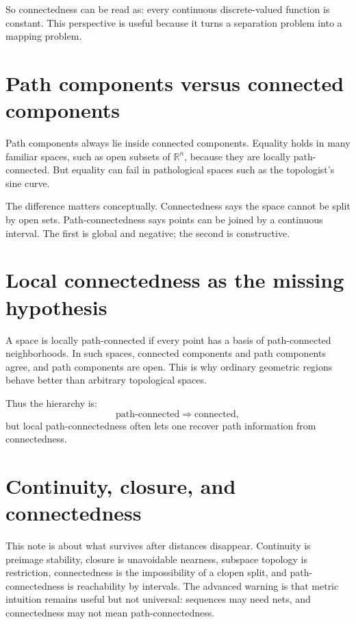 So connectedness can be read as: every continuous discrete-valued function is constant.  This perspective is useful because it turns a separation problem into a mapping problem.

\section{Path components versus connected components}

Path components always lie inside connected components.  Equality holds in many familiar spaces, such as open subsets of \(\mathbb R^n\), because they are locally path-connected.  But equality can fail in pathological spaces such as the topologist's sine curve.

The difference matters conceptually.  Connectedness says the space cannot be split by open sets.  Path-connectedness says points can be joined by a continuous interval.  The first is global and negative; the second is constructive.

\section{Local connectedness as the missing hypothesis}

A space is locally path-connected if every point has a basis of path-connected neighborhoods.  In such spaces, connected components and path components agree, and path components are open.  This is why ordinary geometric regions behave better than arbitrary topological spaces.

Thus the hierarchy is:
\[
  \text{path-connected}\Rightarrow\text{connected},
\]
but local path-connectedness often lets one recover path information from connectedness.

\section{Continuity, closure, and connectedness}

This note is about what survives after distances disappear.  Continuity is preimage stability, closure is unavoidable nearness, subspace topology is restriction, connectedness is the impossibility of a clopen split, and path-connectedness is reachability by intervals.  The advanced warning is that metric intuition remains useful but not universal: sequences may need nets, and connectedness may not mean path-connectedness.
